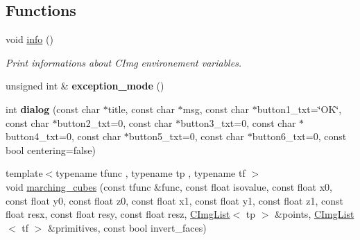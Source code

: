 \subsection*{Functions}
\begin{DoxyCompactItemize}
\item 
void \hyperlink{namespacecimg__library_1_1cimg_aca9c244dc4cff3bc596ed8b0cd7570ee}{info} ()
\begin{DoxyCompactList}\small\item\em Print informations about CImg environement variables. \item\end{DoxyCompactList}\item 
\hypertarget{namespacecimg__library_1_1cimg_ac8ac1e757018949dcf8b82495932ba95}{
unsigned int \& {\bfseries exception\_\-mode} ()}
\label{namespacecimg__library_1_1cimg_ac8ac1e757018949dcf8b82495932ba95}

\item 
\hypertarget{namespacecimg__library_1_1cimg_aad037a737c9d825c84b0306dc691a32f}{
int {\bfseries dialog} (const char $\ast$title, const char $\ast$msg, const char $\ast$button1\_\-txt=\char`\"{}OK\char`\"{}, const char $\ast$button2\_\-txt=0, const char $\ast$button3\_\-txt=0, const char $\ast$button4\_\-txt=0, const char $\ast$button5\_\-txt=0, const char $\ast$button6\_\-txt=0, const bool centering=false)}
\label{namespacecimg__library_1_1cimg_aad037a737c9d825c84b0306dc691a32f}

\item 
\hypertarget{namespacecimg__library_1_1cimg_a16302418e97815e8ef7aa90d983dba1f}{
{\footnotesize template$<$typename tfunc , typename tp , typename tf $>$ }\\void \hyperlink{namespacecimg__library_1_1cimg_a16302418e97815e8ef7aa90d983dba1f}{marching\_\-cubes} (const tfunc \&func, const float isovalue, const float x0, const float y0, const float z0, const float x1, const float y1, const float z1, const float resx, const float resy, const float resz, \hyperlink{structcimg__library_1_1_c_img_list}{CImgList}$<$ tp $>$ \&points, \hyperlink{structcimg__library_1_1_c_img_list}{CImgList}$<$ tf $>$ \&primitives, const bool invert\_\-faces)}
\label{namespacecimg__library_1_1cimg_a16302418e97815e8ef7aa90d983dba1f}


\end{DoxyCompactItemize}
